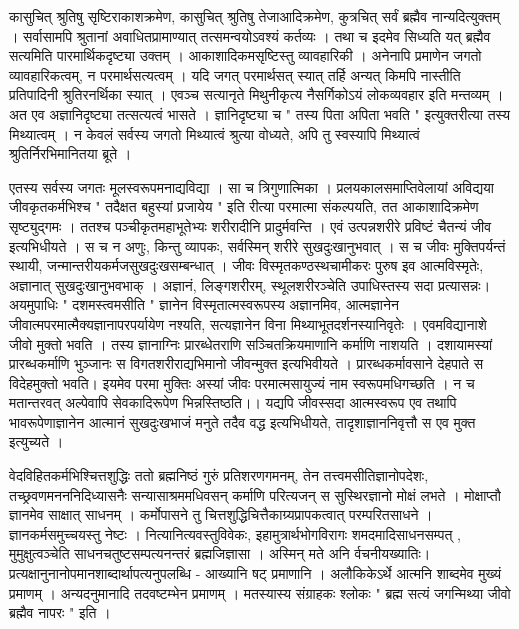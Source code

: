 कासुचित् श्रुतिषु सृष्टिराकाशक्रमेण, कासुचित् श्रुतिषु तेजाआदिक्रमेण, कुत्रचित् सर्वं ब्रह्मैव नान्यदित्युक्तम् । सर्वासामपि श्रुतानां अवाधितप्रामाण्यात् तत्समन्वयोऽवश्यं कर्तव्यः । तथा च इदमेव सिध्यति यत् ब्रह्मैव सत्यमिति पारमार्थिकदृष्ट्या उक्तम् । आकाशादिकमसृष्टिस्तु व्यावहारिकी । अनेनापि प्रमाणेन जगतो व्यावहारिकत्वम्, न परमार्थसत्यत्वम् । यदि जगत् परमार्थसत् स्यात् तर्हि अन्यत् किमपि नास्तीति प्रतिपादिनी श्रुतिरनर्थिका स्यात् । एवञ्च सत्यानृते मिथुनीकृत्य नैसर्गिकोऽयं लोकव्यवहार इति मन्तव्यम् । अत एव अज्ञानिदृष्ट्या तत्सत्यत्वं भासते । ज्ञानिदृष्ट्या च " तस्य पिता अपिता भवति " इत्युक्तरीत्या तस्य मिथ्यात्वम् । न केवलं सर्वस्य जगतो मिथ्यात्वं श्रुत्या वोध्यते, अपि तु स्वस्यापि मिथ्यात्वं श्रुतिर्निरभिमानितया ब्रूते ।

एतस्य सर्वस्य जगतः मूलस्वरूपमनाद्यविद्या । सा च त्रिगुणात्मिका । प्रलयकालसमाप्तिवेलायां अविद्यया जीवकृतकर्मभिश्च " तदैक्षत बहुस्यां प्रजायेय " इति रीत्या परमात्मा संकल्पयति, तत आकाशादिक्रमेण सृष्ट्युद्गमः । ततश्च पञ्चीकृतमहाभूतेभ्यः शरीरादीनि प्रादुर्मवन्ति । एवं उत्पन्नशरीरे प्रविष्टं चैतन्यं जीव इत्यभिधीयते । स च  न अणुः, किन्तु व्यापकः, सर्वस्मिन् शरीरे सुखदुःखानुभवात् । स च जीवः मुक्तिपर्यन्तं स्थायी, जन्मान्तरीयकर्मजसुखदुःखसम्बन्धात् । जीवः विस्मृतकण्ठस्थचामीकरः पुरुष इव आत्मविस्मृतेः, अज्ञानात् सुखदुःखानुभवभाक् । अज्ञानं, लिङ्गशरीरम्, स्थूलशरीरञ्चेति उपाधिस्तस्य सदा प्रत्यासन्नः। अयमुपाधिः " दशमस्त्वमसीति " ज्ञानेन विस्मृतात्मस्वरूपस्य अज्ञानमिव, आत्मज्ञानेन जीवात्मपरमात्मैक्यज्ञानापरपर्यायेण नश्यति, सत्यज्ञानेन विना मिथ्याभूतदर्शनस्यानिवृतेः । एवमविद्यानाशे जीवो मुक्तो भवति । तस्य ज्ञानाग्निः प्रारब्धेतराणि सञ्चितक्रियमाणानि कर्माणि नाशयति । दशायामस्यां प्रारब्धकर्माणि भुञ्जानः स विगतशरीराद्यभिमानो जीवन्मुक्त इत्यभिवीयते । प्रारब्धकर्मावसाने देहपाते स विदेहमुक्तो भवति। इयमेव परमा मुक्तिः अस्यां जीवः परमात्मसायुज्यं नाम स्वरूपमधिगच्छति । न च मतान्तरवत् अल्पेवापि सेवकादिरूपेण भिन्नस्तिष्ठति।। यद्यपि जीवस्सदा आत्मस्वरूप एव तथापि भावरूपेणाज्ञानेन आत्मानं सुखदुःखभाजं मनुते तदैव वद्ध इत्यभिधीयते, तादृशाज्ञाननिवृत्तौ स एव मुक्त इत्युच्यते ।

वेदविहितकर्मभिश्चित्तशुद्धिः ततो ब्रह्मनिष्ठं गुरुं प्रतिशरणगमनम्, तेन तत्त्वमसीतिज्ञानोपदेशः, तच्छ्रवणमनननिदिध्यासनैः सन्यासाश्रममधिवसन् कर्माणि परित्यजन् स सुस्थिरज्ञानो मोक्षं लभते । मोक्षाप्तौ ज्ञानमेव साक्षात् साधनम् । कर्मोपासने तु चित्तशुद्धिचित्तैकाग्र्यप्रापकत्वात् परम्परितसाधने । ज्ञानकर्मसमुच्चयस्तु नेष्टः । नित्यानित्यवस्तुविवेकः, इहामुत्रार्थभोगविरागः शमदमादिसाधनसम्पत् , मुमुक्षुत्वञ्चेति साधनचतुष्टसम्पत्यनन्तरं ब्रह्मजिज्ञासा । अस्मिन् मते अनि र्वचनीयख्यातिः। प्रत्यक्षानुनानोपमानशाब्दार्थापत्यनुपलब्धि - आख्यानि षट् प्रमाणानि । अलौकिकेऽर्थे आत्मनि शाब्दमेव मुख्यं प्रमाणम् । अन्यदनुमानादि तदवष्टम्भेन प्रमाणम् । मतस्यास्य संग्राहकः श्लोकः " ब्रह्म सत्यं जगन्मिथ्या जीवो ब्रह्मैव नापरः " इति । 

